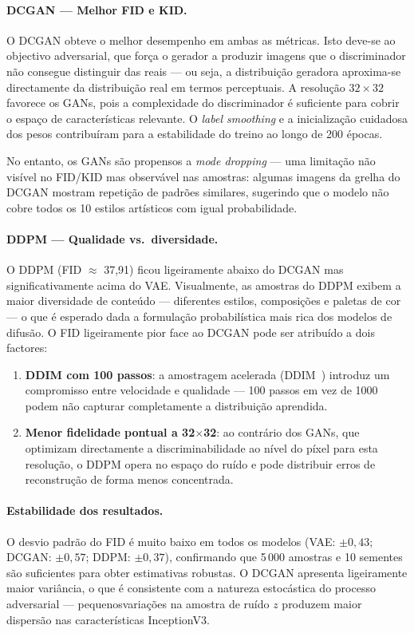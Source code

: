 \documentclass[12pt,a4paper]{article}
\begin{document}
\paragraph{DCGAN — Melhor FID e KID.}
O DCGAN obteve o melhor desempenho em ambas as métricas. Isto deve-se ao objectivo
adversarial, que força o gerador a produzir imagens que o discriminador não consegue
distinguir das reais — ou seja, a distribuição geradora aproxima-se directamente
da distribuição real em termos perceptuais. A resolução $32\times32$ favorece os
GANs, pois a complexidade do discriminador é suficiente para cobrir o espaço de
características relevante. O \textit{label smoothing} e a inicialização cuidadosa
dos pesos contribuíram para a estabilidade do treino ao longo de 200 épocas.

No entanto, os GANs são propensos a \textit{mode dropping} — uma limitação não
visível no FID/KID mas observável nas amostras: algumas imagens da grelha do DCGAN
mostram repetição de padrões similares, sugerindo que o modelo não cobre todos os
10 estilos artísticos com igual probabilidade.

\paragraph{DDPM — Qualidade vs.\ diversidade.}
O DDPM (FID $\approx$ 37,91) ficou ligeiramente abaixo do DCGAN mas significativamente
acima do VAE. Visualmente, as amostras do DDPM exibem a maior diversidade de
conteúdo — diferentes estilos, composições e paletas de cor — o que é esperado
dada a formulação probabilística mais rica dos modelos de difusão. O FID
ligeiramente pior face ao DCGAN pode ser atribuído a dois factores:

\begin{enumerate}
  \item \textbf{DDIM com 100 passos}: a amostragem acelerada (DDIM~\cite{song2020ddim})
        introduz um compromisso entre velocidade e qualidade — 100 passos em vez
        de 1000 podem não capturar completamente a distribuição aprendida.
  \item \textbf{Menor fidelidade pontual a 32$\times$32}: ao contrário dos GANs,
        que optimizam directamente a discriminabilidade ao nível do píxel para
        esta resolução, o DDPM opera no espaço do ruído e pode distribuir
        erros de reconstrução de forma menos concentrada.
\end{enumerate}

\paragraph{Estabilidade dos resultados.}
O desvio padrão do FID é muito baixo em todos os modelos
(VAE: $\pm 0{,}43$; DCGAN: $\pm 0{,}57$; DDPM: $\pm 0{,}37$),
confirmando que 5\,000 amostras e 10 sementes são suficientes para obter estimativas
robustas. O DCGAN apresenta ligeiramente maior variância, o que é consistente
com a natureza estocástica do processo adversarial — pequenosvariações na amostra
de ruído $z$ produzem maior dispersão nas características InceptionV3.
\end{document}
